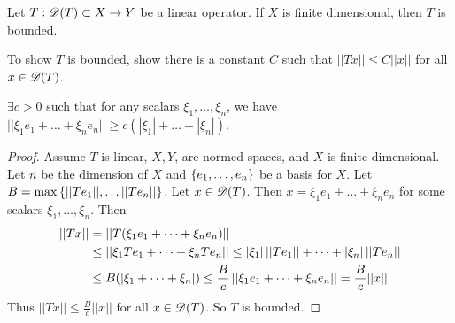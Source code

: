 \documentclass[]{article}
\begin{document}
\begin{theorem}
	Let $T:\mathscr{D}(T)\subset X\rightarrow Y$ be a linear operator. If $X$ is finite dimensional, then $T$ is bounded.
\end{theorem}
\begin{recall}
	To show $T$ is bounded, show there is a constant $C$ such that $||Tx||\leq C||x||$ for all $x\in\mathscr{D}(T)$.
\end{recall}
\begin{recall}
	$\exists c>0$ such that for any scalars $\xi_1,\dots,\xi_n$, we have $||\xi_1e_1+\dots+\xi_ne_n||\geq c(|\xi_1|+\dots+|\xi_n|)$.
\end{recall}
\begin{proof}
	Assume $T$ is linear, $X,Y$, are normed spaces, and $X$ is finite dimensional.
	Let $n$ be the dimension of $X$ and $\left\{ e_1,\dots,e_n \right\}$ be a basis for $X$.
	Let $B = \max\left\{ ||Te_1||,\dots||Te_n|| \right\}$.
	Let $x\in\mathscr{D}(T)$. Then $x=\xi_1e_1+\dots+\xi_ne_n$ for some scalars $\xi_1,\dots,\xi_n$.
	Then 
	\begin{align*}
		||Tx|| &= ||T(\xi_1e_1+\dots+\xi_{n}e_{n})|| \\
			   &\leq \left|\left|\xi_1Te_1+\dots+\xi_{n}Te_{n}\right|\right|
			   \leq |\xi_1|\,||Te_1||+\dots+|\xi_n|\,||Te_n|| \\
			   &\leq B(|\xi_1+\dots+\xi_n|)
			   \leq \frac Bc\left|\left|\xi_1e_1+\dots+\xi_{n}e_{n}\right|\right|
			   = \frac Bc||x||
	\end{align*}
	Thus $||Tx||\leq\frac Bc||x||$ for all $x\in\mathscr{D}(T)$.
	So $T$ is bounded.
\end{proof}
\end{document}

